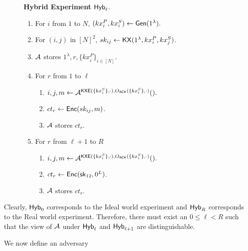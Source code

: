 \begin{figure}[h!]
\begin{framed}
\textbf{Hybrid Experiment} $\mathsf{Hyb}_\ell$.
\begin{enumerate}
    \item For $i$ from $1$ to $N$, $(kx_i^P, kx_i^S) \leftarrow \mathsf{Gen}(1^{\lambda}).$
    \item For $(i, j)$ in $[N]^2$, $sk_{ij} \leftarrow \mathsf{KX}(1^{\lambda}, kx_i^P, kx_j^S)$.
    \item $\mathcal{A}$ stores $1^{\lambda}, r, \{kx_i^P\}_{i \in [N]}$.
    \item For $r$ from $1$ to $\ell$
    \begin{enumerate}
        \item $i, j, m \leftarrow \mathcal{A}^{\mathsf{KXE}(\{kx_i^S\}, \cdot), O_{\mathsf{ACK}}(\{kx_i^S\}, \cdot)}().$
        \item $ct_r \leftarrow \mathsf{Enc}(sk_{ij}, m)$.
        \item $\mathcal{A}$ stores $ct_r$.
    \end{enumerate}
    \item For $r$ from $\ell + 1$ to $R$
    \begin{enumerate}
        \item $i, j, m \leftarrow \mathcal{A}^{\mathsf{KXE}(\{kx_i^S\}, \cdot), O_{\mathsf{ACK}}(\{kx_i^S\}, \cdot)}().$
        \item $ct_r \leftarrow \mathsf{Enc}({\mathsf{sk}}_{12}, 0^{L})$.
        \item $\mathcal{A}$ stores $ct_r$.
    \end{enumerate}
\end{enumerate}
\end{framed}
\end{figure}
Clearly, $\mathsf{Hyb}_0$ corresponds to the Ideal world experiment and $\mathsf{Hyb}_{R}$ corresponds to the Real world experiment. Therefore, there must exist an $0 \leq \ell < R$ such that the view of $\mathcal{A}$ under $\mathsf{Hyb}_{\ell}$ and $\mathsf{Hyb}_{\ell + 1}$ are distinguishable.

We now define an adversary 
\clearpage